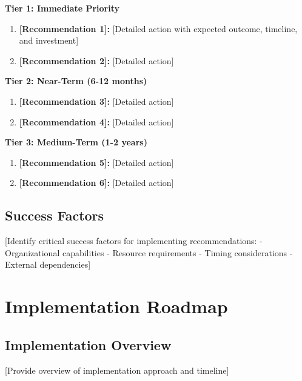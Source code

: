 \documentclass[11pt,letterpaper]{report}
\begin{document}
\begin{recommendationbox}
\textbf{Tier 1: Immediate Priority}
\begin{enumerate}
    \item \textbf{[Recommendation 1]:} [Detailed action with expected outcome, timeline, and investment]
    \item \textbf{[Recommendation 2]:} [Detailed action]
\end{enumerate}

\textbf{Tier 2: Near-Term (6-12 months)}
\begin{enumerate}[start=3]
    \item \textbf{[Recommendation 3]:} [Detailed action]
    \item \textbf{[Recommendation 4]:} [Detailed action]
\end{enumerate}

\textbf{Tier 3: Medium-Term (1-2 years)}
\begin{enumerate}[start=5]
    \item \textbf{[Recommendation 5]:} [Detailed action]
    \item \textbf{[Recommendation 6]:} [Detailed action]
\end{enumerate}
\end{recommendationbox}

\section{Success Factors}

[Identify critical success factors for implementing recommendations:
- Organizational capabilities
- Resource requirements
- Timing considerations
- External dependencies]

\chapter{Implementation Roadmap}

\section{Implementation Overview}

[Provide overview of implementation approach and timeline]
\end{document}
